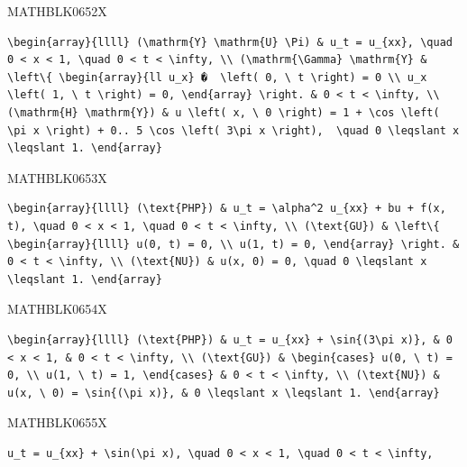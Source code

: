 \documentclass[
  ukrainian,
]{article}
\begin{document}
MATHBLK0652X

\begin{verbatim}
\begin{array}{llll} (\mathrm{Y} \mathrm{U} \Pi) & u_t = u_{xx}, \quad 0 < x < 1, \quad 0 < t < \infty, \\ (\mathrm{\Gamma} \mathrm{Y} & \left\{ \begin{array}{ll u_x} �  \left( 0, \ t \right) = 0 \\ u_x \left( 1, \ t \right) = 0, \end{array} \right. & 0 < t < \infty, \\ (\mathrm{H} \mathrm{Y}) & u \left( x, \ 0 \right) = 1 + \cos \left( \pi x \right) + 0.. 5 \cos \left( 3\pi x \right),  \quad 0 \leqslant x \leqslant 1. \end{array}
\end{verbatim}

MATHBLK0653X

\begin{verbatim}
\begin{array}{llll} (\text{PHP}) & u_t = \alpha^2 u_{xx} + bu + f(x, t), \quad 0 < x < 1, \quad 0 < t < \infty, \\ (\text{GU}) & \left\{ \begin{array}{llll} u(0, t) = 0, \\ u(1, t) = 0, \end{array} \right. & 0 < t < \infty, \\ (\text{NU}) & u(x, 0) = 0, \quad 0 \leqslant x \leqslant 1. \end{array}
\end{verbatim}

MATHBLK0654X

\begin{verbatim}
\begin{array}{llll} (\text{PHP}) & u_t = u_{xx} + \sin{(3\pi x)}, & 0 < x < 1, & 0 < t < \infty, \\ (\text{GU}) & \begin{cases} u(0, \ t) = 0, \\ u(1, \ t) = 1, \end{cases} & 0 < t < \infty, \\ (\text{NU}) & u(x, \ 0) = \sin{(\pi x)}, & 0 \leqslant x \leqslant 1. \end{array}
\end{verbatim}

MATHBLK0655X

\begin{verbatim}
u_t = u_{xx} + \sin(\pi x), \quad 0 < x < 1, \quad 0 < t < \infty,
\end{verbatim}
\end{document}
